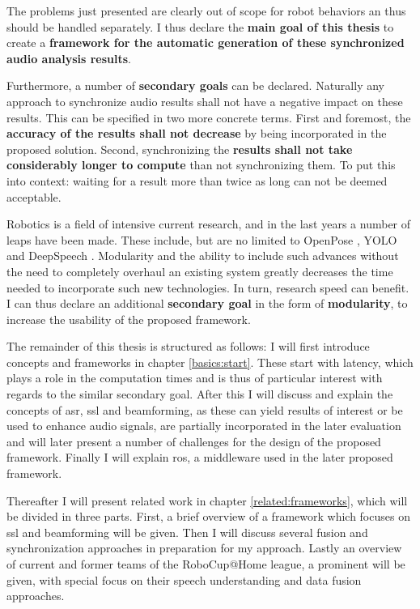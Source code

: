 The problems just presented are clearly out of scope for robot behaviors an thus should be handled separately.
I thus declare the \textbf{main goal of this thesis} to create a \textbf{framework for the automatic generation of these synchronized audio analysis results}.

Furthermore, a number of \textbf{secondary goals} can be declared.
Naturally any approach to synchronize audio results shall not have a negative impact on these results.
This can be specified in two more concrete terms.
First and foremost, the \textbf{accuracy of the results shall not decrease} by being incorporated in the proposed solution.
Second, synchronizing the \textbf{results shall not take considerably longer to compute} than not synchronizing them.
To put this into context: waiting for a result more than twice as long can not be deemed acceptable.


Robotics is a field of intensive current research, and in the last years a number of leaps have been made.
These include, but are no limited to OpenPose \cite{cao2018openpose}, YOLO \cite{yolov3} and DeepSpeech \cite{deepspeech}.
Modularity and the ability to include such advances without the need to completely overhaul an existing system greatly decreases the time needed to incorporate such new technologies.
In turn, research speed can benefit.
I can thus declare an additional \textbf{secondary goal} in the form of \textbf{modularity}, to increase the usability of the proposed framework.


The remainder of this thesis is structured as follows:
I will first introduce concepts and frameworks in chapter \ref{basics:start}.
These start with latency, which plays a role in the computation times and is thus of particular interest with regards to the similar secondary goal.
After this I will discuss and explain the concepts of \gls{asr}, \gls{ssl} and beamforming, as these can yield results of interest or be used to enhance audio signals, are partially incorporated in the later evaluation and will later present a number of challenges for the design of the proposed framework.
Finally I will explain \gls{ros}, a middleware used in the later proposed framework.

Thereafter I will present related work in chapter \ref{related:frameworks}, which will be divided in three parts.
First, a brief overview of a framework which focuses on \gls{ssl} and beamforming will be given.
Then I will discuss several fusion and synchronization approaches in preparation for my approach.
Lastly an overview of current and former teams of the RoboCup@Home league, a prominent will be given, with special focus on their speech understanding and data fusion approaches.


